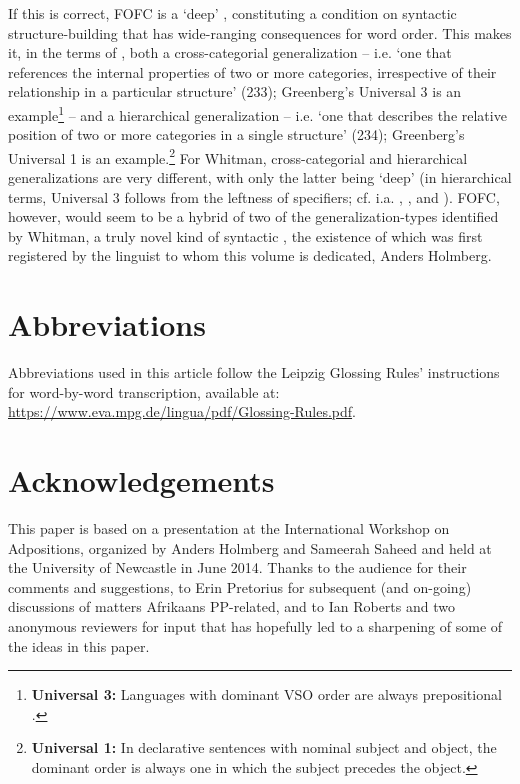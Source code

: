 \documentclass[output=paper]{LSP/langsci}
\begin{document}
If this is correct, FOFC is a ‘deep’ , constituting a condition on syntactic structure-building that has wide-ranging consequences for word order. This makes it, in the terms of \citet{Whitman2008}, both a cross-categorial generalization – i.e. ‘one that references the internal properties of two or more categories, irrespective of their relationship in a particular structure’ (233); Greenberg’s Universal 3 is an example\footnote{\textbf{Universal 3:} Languages with dominant VSO order are always prepositional \citep[78]{greenberg1963}.} – and a hierarchical generalization – i.e. ‘one that describes the relative position of two or more categories in a single structure’ (234); Greenberg’s Universal 1 is an example.\footnote{\textbf{Universal 1:} In declarative sentences with nominal subject and object, the dominant order is always one in which the subject precedes the object.} For Whitman, cross-categorial and hierarchical generalizations are very different, with only the latter being ‘deep’ (in hierarchical terms, Universal 3 follows from the  leftness of specifiers; cf. i.a. \citealt{Kayne1994}, \citealt{AckemaNeeleman2002}, and \citealt{BiberauerEtAl2014nochoice}). 
FOFC, however, would seem to be a hybrid of two of the generalization-types identified by Whitman, a truly novel kind of 
syntactic , the existence of which was first registered by the linguist to whom this volume is dedicated, Anders Holmberg.
 

\section*{Abbreviations}
Abbreviations used in this article follow the Leipzig Glossing Rules’ instructions for word-by-word transcription, available at: \url{https://www.eva.mpg.de/lingua/pdf/Glossing-Rules.pdf}.

\section*{Acknowledgements}
This paper is based on a presentation at the International Workshop on Adpositions, organized by Anders Holmberg and Sameerah Saheed and held at the University of Newcastle in June 2014. Thanks to the audience for their comments and suggestions, to Erin Pretorius for subsequent (and on-going) discussions of matters {Afrikaans} PP-related, and to Ian Roberts and two anonymous reviewers for input that has hopefully led to a sharpening of some of the ideas in this paper. 


{\sloppy\printbibliography[heading=subbibliography,notkeyword=this]}
\end{document}
